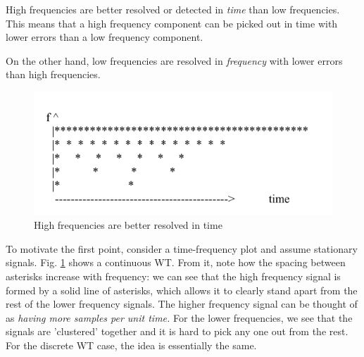 \documentclass{article}
\begin{document}
		High frequencies are better resolved or detected in \textit{time} than low frequencies. This means that a high frequency component can be picked out in time with lower errors than a low frequency component.
		
		On the other hand, low frequencies are resolved in \textit{frequency} with lower errors than high frequencies.
		
		\begin{figure}[!t]
			\centering
			\includegraphics{img/hi_freq_resol_1}
			\caption{High frequencies are better resolved in time}
			\label{fig:hi_freq_resol_1}
		\end{figure}
		
		To motivate the first point, consider a time-frequency plot and assume stationary signals. Fig. \ref{fig:hi_freq_resol_1} shows a continuous WT. From it, note how the spacing between asterisks increase with frequency: we can see that the high frequency signal is formed by a solid line of asterisks, which allows it to clearly stand apart from the rest of the lower frequency signals. The higher frequency signal can be thought of as \textit{having more samples per unit time.} For the lower frequencies, we see that the signals are 'clustered' together and it is hard to pick any one out from the rest. For the discrete WT case, the idea is essentially the same.
		
\end{document}
